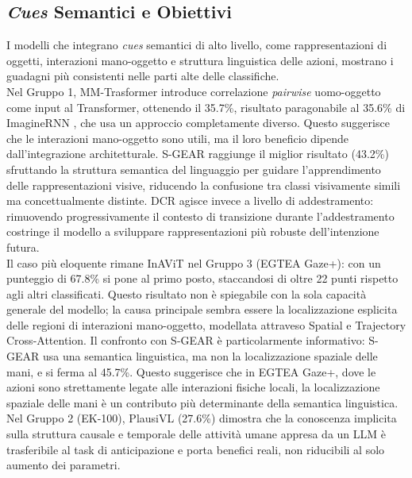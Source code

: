 \subsection{\textit{Cues} Semantici e Obiettivi}
I modelli che integrano \textit{cues} semantici di alto livello, come rappresentazioni di oggetti, interazioni mano-oggetto e struttura linguistica delle azioni, mostrano i guadagni più consistenti nelle parti alte delle classifiche. \\
Nel Gruppo 1, MM-Trasformer \cite{roy2021action} introduce correlazione \textit{pairwise} uomo-oggetto come input al Transformer, ottenendo il 35.7\%, risultato paragonabile al 35.6\% di ImagineRNN \cite{wu2020learning}, che usa un approccio completamente diverso. Questo suggerisce che le interazioni mano-oggetto sono utili, ma il loro beneficio dipende dall'integrazione architetturale. S-GEAR \cite{diko2024semantically} raggiunge il miglior risultato (43.2\%) sfruttando la struttura semantica del linguaggio per guidare l'apprendimento delle rappresentazioni visive, riducendo la confusione tra classi visivamente simili ma concettualmente distinte. DCR \cite{xu2022learning} agisce invece a livello di addestramento: rimuovendo progressivamente il contesto di transizione durante l'addestramento costringe il modello a sviluppare rappresentazioni più robuste dell'intenzione futura. \\
Il caso più eloquente rimane InAViT \cite{roy2024interaction} nel Gruppo 3 (EGTEA Gaze+): con un punteggio di 67.8\% si pone al primo posto, staccandosi di oltre 22 punti rispetto agli altri classificati. Questo risultato non è spiegabile con la sola capacità generale del modello; la causa principale sembra essere la localizzazione esplicita delle regioni di interazioni mano-oggetto, modellata attraveso Spatial e Trajectory Cross-Attention. Il confronto con S-GEAR \cite{diko2024semantically} è particolarmente informativo: S-GEAR usa una semantica linguistica, ma non la localizzazione spaziale delle mani, e si ferma al 45.7\%. Questo suggerisce che in EGTEA Gaze+, dove le azioni sono strettamente legate alle interazioni fisiche locali, la localizzazione spaziale delle mani è un contributo più determinante della semantica linguistica.
Nel Gruppo 2 (EK-100), PlausiVL \cite{mittal2024can} (27.6\%) dimostra che la conoscenza implicita sulla struttura causale e temporale delle attività umane appresa da un LLM è trasferibile al task di anticipazione e porta benefici reali, non riducibili al solo aumento dei parametri.
